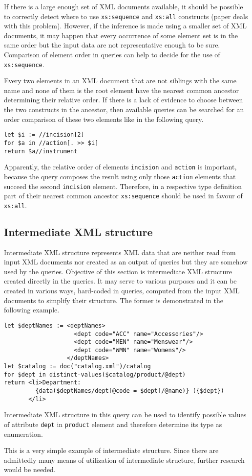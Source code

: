 If there is a large enough set of XML documents available, it should be possible to correctly detect where to use \texttt{xs:sequence} and \texttt{xs:all} constructs (paper \cite{Vosta:2008:EAC:1802514.1802522} deals with this problem). However, if the inference is made using a smaller set of XML documents, it may happen that every occurrence of some element set is in the same order but the input data are not representative enough to be sure. Comparison of element order in queries can help to decide for the use of \texttt{xs:sequence}.

Every two elements in an XML document that are not siblings with the same name and none of them is the root element have the nearest common ancestor determining their relative order. If there is a lack of evidence to choose between the two constructs in the ancestor, then available queries can be searched for an order comparison of these two elements like in the following query.

\begin{verbatim}
let $i := //incision[2]
for $a in //action[. >> $i]
return $a//instrument
\end{verbatim}

Apparently, the relative order of elements \texttt{incision} and \texttt{action} is important, because the query composes the result using only those \texttt{action} elements that succeed the second \texttt{incision} element. Therefore, in a respective type definition part of their nearest common ancestor \texttt{xs:sequence} should be used in favour of \texttt{xs:all}.

\subsection{Intermediate XML structure}
Intermediate XML structure represents XML data that are neither read from input XML documents nor created as an output of queries but they are somehow used by the queries. Objective of this section is intermediate XML structure created directly in the queries. It may serve to various purposes and it can be created in various ways, hard-coded in queries, computed from the input XML documents to simplify their structure. The former is demonstrated in the following example.

\begin{verbatim}
let $deptNames := <deptNames> 
                    <dept code="ACC" name="Accessories"/> 
                    <dept code="MEN" name="Menswear"/> 
                    <dept code="WMN" name="Womens"/> 
                  </deptNames> 
let $catalog := doc("catalog.xml")/catalog 
for $dept in distinct-values($catalog/product/@dept) 
return <li>Department:
         {data($deptNames/dept[@code = $dept]/@name)} ({$dept})
       </li> 
\end{verbatim}

Intermediate XML structure in this query can be used to identify possible values of attribute \texttt{dept} in \texttt{product} element and therefore determine its type as enumeration.

This is a very simple example of intermediate structure. Since there are admittedly many means of utilization of intermediate structure, further research would be needed.